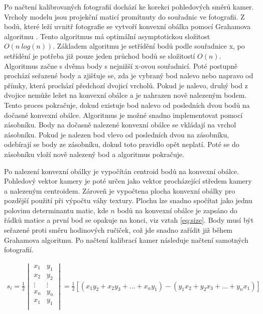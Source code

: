 \documentclass[11pt,twoside,a4paper]{book}
\begin{document}
Po načtení kalibrovaných fotografií dochází ke korekci pohledových směrů kamer. Vrcholy modelu jsou projekční maticí promítnuty do souřadnic ve fotografii. Z bodů, které leží uvnitř fotografie se vytvoří konvexní obálka pomocí Grahamova algoritmu \cite{Andrew79}.  Tento algoritmus má optimální asymptotickou složitost $O(n~log(n))$. Základem algoritmu je setřídění bodů podle souřadnice x, po setřídění je potřeba již pouze jeden průchod bodů se složitostí $O(n)$. Algoritmus začne s dvěma body s nejnižší x-ovou souřadnicí. Poté postupně prochází seřazené body a zjišťuje se, zda je vybraný bod nalevo nebo napravo od přímky, která prochází předchozí dvojicí vrcholů. Pokud je nalevo, druhý bod z dvojice nemůže ležet na konvexní obálce a je nahrazen nově nalezeným bodem. Tento proces pokračuje, dokud existuje bod nalevo od posledních dvou bodů na dočasné konvexní obálce. Algoritmus je možné snadno implementovat pomocí zásobníku. Body na dočasně nalezené konvexní obálce se vkládají na vrchol zásobníku. Pokud je nalezen bod vlevo od posledních dvou na zásobníku, odebírají se body ze zásobníku, dokud toto pravidlo opět neplatí. Poté se do zásobníku vloží nově nalezený bod a algoritmus pokračuje.

Po nalezení konvexní obálky je vypočítán centroid bodů na konvexní obálce. Pohledový vektor kamery je poté určen jako vektor procházející středem kamery a nalezeným centroidem. Zároveň je vypočtena plocha konvexní obálky pro pozdější použití při výpočtu váhy textury. Plochu lze snadno spočítat jako jednu polovinu determinantu matic, kde $n$ bodů na konvexní obálce je zapsáno do řádků matice a první bod se opakuje na konci, viz vztah \ref{eq:size}. Body musí být seřazené proti směru hodinových ručiček, což jde snadno zařídit již během Grahamova algoritmu. Po načtení kalibrací kamer následuje načtení samotných fotografií.

\begin{align}
\label{eq:size}
s_i = \frac{1}{2} 
\begin{vmatrix}
x_1 & y_1 \\
x_2 & y_2 \\
\vdots & \vdots \\
x_n & y_n \\
x_1 & y_1 \\
\end{vmatrix}
= \frac{1}{2} [(x_1 y_2 + x_2 y_3 + \ldots + x_n y_1) - (y_1 x_2 + y_2 x_3 + \ldots + y_n x_1)]
\end{align}
\end{document}
